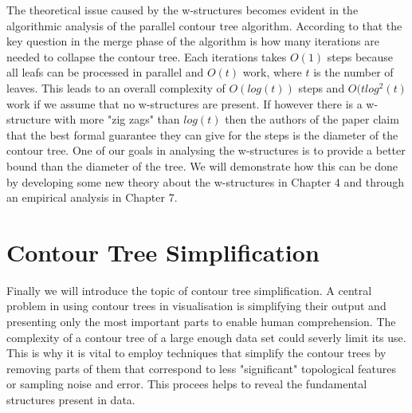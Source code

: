 
The theoretical issue caused by the w-structures becomes evident in the algorithmic analysis of the parallel contour tree algorithm. According to that the key question in the merge phase of the algorithm is how many iterations are needed to collapse the contour tree. Each iterations takes $O(1)$ steps because all leafs can be processed in parallel and $O(t)$ work, where $t$ is the number of leaves. This leads to an overall complexity of $O(log(t))$ steps and $O(tlog^2(t)$ work if we assume that no w-structures are present. If however there is a w-structure with more "zig zags" than $log(t)$ then the authors of the paper claim that the best formal guarantee they can give for the steps is the diameter of the contour tree. One of our goals in analysing the w-structures is to provide a better bound than the diameter of the tree. We will demonstrate how this can be done by developing some new theory about the w-structures in Chapter 4 and through an empirical analysis in Chapter 7.


\section{Contour Tree Simplification}

Finally we will introduce the topic of contour tree simplification. A central problem in using contour trees in visualisation is simplifying their output and presenting only the most important parts to enable human comprehension. The complexity of a contour tree of a large enough data set could severly limit its use. This is why it is vital to employ techniques that simplify the contour trees by removing parts of them that correspond to less "significant" topological features or sampling noise and error. This procees helps to reveal the fundamental structures present in data.



